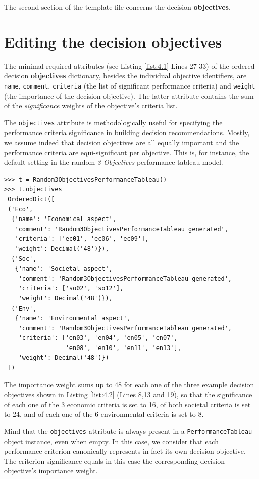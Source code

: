 The second section of the template file concerns the decision \textbf{objectives}.

\section{Editing the decision objectives}
\label{sec:4.3}

The minimal required attributes (see Listing \ref{list:4.1} Lines 27-33) of the ordered decision \textbf{objectives} dictionary, besides the individual objective identifiers, are \texttt{name}, \texttt{comment}, \texttt{criteria} (the list of significant performance criteria) and \texttt{weight} (the importance of the decision objective). The latter attribute contains the sum of the \emph{significance} weights of the objective's criteria list. 

The \texttt{objectives} attribute is methodologically useful for specifying the performance criteria significance in building decision recommendations. Mostly, we assume indeed that decision objectives are all equally important and the performance criteria are equi-significant per objective. This is, for instance, the default setting in the random \emph{3-Objectives} performance tableau model.

\begin{lstlisting}[caption={Example of decision objectives' description},label=list:4.2,basicstyle=\footnotesize]
>>> t = Random3ObjectivesPerformanceTableau()
>>> t.objectives
 OrderedDict([
 ('Eco',
  {'name': 'Economical aspect',
   'comment': 'Random3ObjectivesPerformanceTableau generated',
   'criteria': ['ec01', 'ec06', 'ec09'],
   'weight': Decimal('48')}),
  ('Soc',
   {'name': 'Societal aspect',
    'comment': 'Random3ObjectivesPerformanceTableau generated',
    'criteria': ['so02', 'so12'],
    'weight': Decimal('48')}),
  ('Env',
   {'name': 'Environmental aspect',
    'comment': 'Random3ObjectivesPerformanceTableau generated',
    'criteria': ['en03', 'en04', 'en05', 'en07',
                 'en08', 'en10', 'en11', 'en13'],
    'weight': Decimal('48')})
 ])
\end{lstlisting}

The importance weight sums up to 48 for each one of the three example decision objectives shown in Listing \ref{list:4.2} (Lines 8,13 and 19), so that the significance of each one of the 3 economic criteria is set to 16, of both societal criteria is set to 24, and of each one of the 6 environmental criteria is set to 8.

\begin{svgraybox}Mind that the \texttt{objectives} attribute is always present in a \texttt{PerformanceTableau} object instance, even when empty. In this case, we consider that each performance criterion canonically represents in fact its own decision objective. The criterion significance equals in this case the corresponding decision objective's importance weight.\end{svgraybox}

